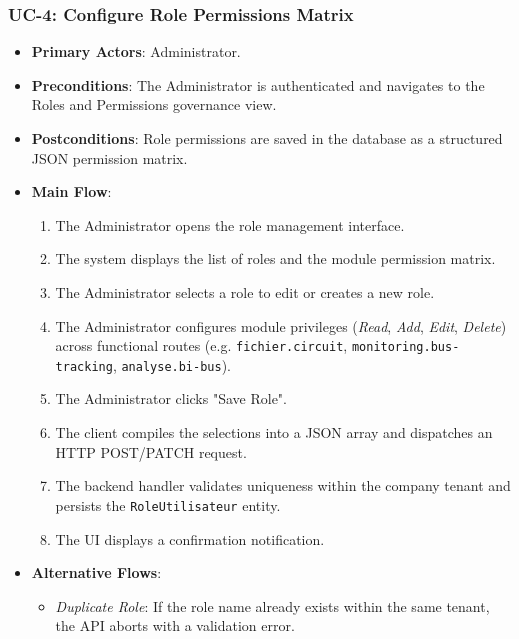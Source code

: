 \subsubsection{UC-4: Configure Role Permissions Matrix}
\begin{itemize}
  \item \textbf{Primary Actors}: Administrator.
  \item \textbf{Preconditions}: The Administrator is authenticated and navigates to the Roles and Permissions governance view.
  \item \textbf{Postconditions}: Role permissions are saved in the database as a structured JSON permission matrix.
  \item \textbf{Main Flow}:
  \begin{enumerate}
    \item The Administrator opens the role management interface.
    \item The system displays the list of roles and the module permission matrix.
    \item The Administrator selects a role to edit or creates a new role.
    \item The Administrator configures module privileges (\emph{Read}, \emph{Add}, \emph{Edit}, \emph{Delete}) across functional routes (e.g. \texttt{fichier.circuit}, \texttt{monitoring.bus-tracking}, \texttt{analyse.bi-bus}).
    \item The Administrator clicks "Save Role".
    \item The client compiles the selections into a JSON array and dispatches an HTTP POST/PATCH request.
    \item The backend handler validates uniqueness within the company tenant and persists the \texttt{RoleUtilisateur} entity.
    \item The UI displays a confirmation notification.
  \end{enumerate}
  \item \textbf{Alternative Flows}:
  \begin{itemize}
    \item \emph{Duplicate Role}: If the role name already exists within the same tenant, the API aborts with a validation error.
  \end{itemize}
\end{itemize}

